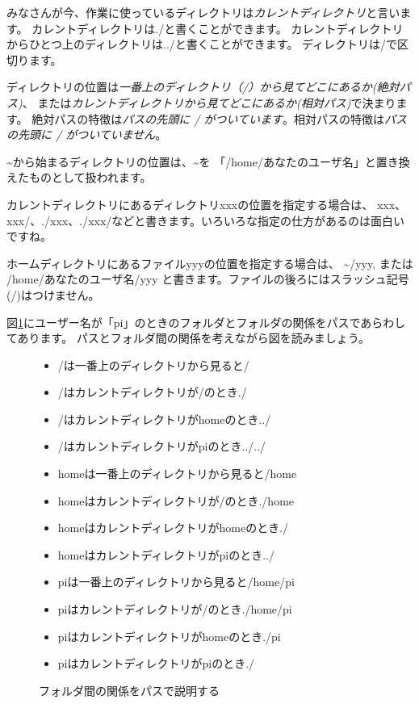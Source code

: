 みなさんが今、作業に使っているディレクトリは\emph{カレントディレクトリ}と言います。
カレントディレクトリは./と書くことができます。
カレントディレクトリからひとつ上のディレクトリは../と書くことができます。
ディレクトリは/で区切ります。

ディレクトリの位置は\emph{一番上のディレクトリ（/）から見てどこにあるか(絶対パス)}、
または\emph{カレントディレクトリから見てどこにあるか(相対パス)}で決まります。
絶対パスの特徴は\emph{パスの先頭に / がついています}。相対パスの特徴は\emph{パスの先頭に / がついていません}。

\textasciitilde から始まるディレクトリの位置は、\textasciitilde を
「/home/あなたのユーザ名」と置き換えたものとして扱われます。

カレントディレクトリにあるディレクトリxxxの位置を指定する場合は、
xxx、xxx/、./xxx、./xxx/などと書きます。いろいろな指定の仕方があるのは面白いですね。

ホームディレクトリにあるファイルyyyの位置を指定する場合は、
\textasciitilde /yyy, または /home/あなたのユーザ名/yyy と書きます。ファイルの後ろにはスラッシュ記号(/)はつけません。

図\ref{fig:folder-path}にユーザー名が「pi」のときのフォルダとフォルダの関係をパスであらわしてあります。
パスとフォルダ間の関係を考えながら図を読みましょう。

\begin{figure}[H]
    \begin{minipage}{0.4\hsize}
        
    \end{minipage}
    \begin{minipage}{0.6\hsize}
        \begin{itemize}
        \item /は一番上のディレクトリから見ると/
        \item /はカレントディレクトリが/のとき./
        \item /はカレントディレクトリがhomeのとき../
        \item /はカレントディレクトリがpiのとき../../
        \item homeは一番上のディレクトリから見ると/home
        \item homeはカレントディレクトリが/のとき./home
        \item homeはカレントディレクトリがhomeのとき./
        \item homeはカレントディレクトリがpiのとき../
        \item piは一番上のディレクトリから見ると/home/pi
        \item piはカレントディレクトリが/のとき./home/pi
        \item piはカレントディレクトリがhomeのとき./pi
        \item piはカレントディレクトリがpiのとき./
        \end{itemize}
    \end{minipage}
    \caption{フォルダ間の関係をパスで説明する}
    \label{fig:folder-path}
\end{figure}

